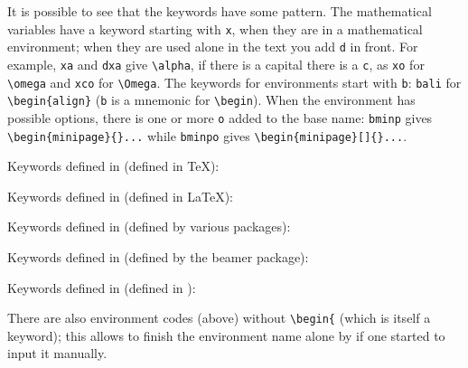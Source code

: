 It is possible to see that the keywords have some pattern. The mathematical variables have a keyword starting with \verb|x|, when they are in a mathematical environment; when they are used alone in the text you add \verb|d| in front. For example, \verb|xa| and \verb|dxa| give \verb|\alpha|, if there is a capital there is a \verb|c|, as  \verb|xo| for \verb|\omega| and \verb|xco| for \verb|\Omega|. The keywords for environments start with \verb|b|: \verb|bali| for \verb|\begin{align}| (\verb|b| is a mnemonic for \verb|\begin|). When the environment has possible options, there is one or more \verb|o| added to the base name: \verb|bminp| gives \verb|\begin{minipage}{}...| while \verb|bminpo| gives \verb|\begin{minipage}[]{}...|.

%
Keywords defined in  (defined in \TeX):
%


Keywords defined in  (defined in \LaTeX):
%


Keywords defined in  (defined by various packages):


Keywords defined in  (defined by the beamer package):


Keywords defined in  (defined in \ConTeXt):


There are also environment codes (above) without \verb|\begin{| (which is itself a keyword); this allows to finish the environment name alone by  if one started to input it manually.

